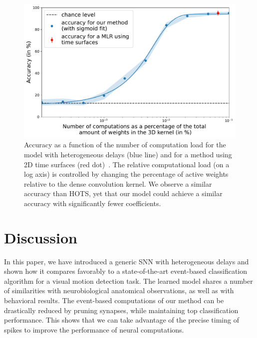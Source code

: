 \documentclass[default]{sn-jnl}%
\theoremstyle{thmstyleone}%
\theoremstyle{thmstyletwo}%
\theoremstyle{thmstylethree}%
\newcommand{\note}[1]{{\sethlcolor{yellow}\hl{#1}}}
\begin{document}
%
\begin{figure}%
    \centering
    \includegraphics[width=0.95\linewidth]{figures/accuracy.pdf}
    \caption{Accuracy as a function of the number of computation load for the model with heterogeneous delays (blue line) and for a method using 2D time surfaces (red dot)~\citep{grimaldi_robust_2022}. The relative computational load (on a log axis) is controlled by changing the percentage of active weights relative to the dense convolution kernel. We observe a similar accuracy than HOTS, yet that our model could achieve a similar accuracy with significantly fewer coefficients.}
    \label{fig:accuracy}
\end{figure}

%
\section{Discussion}
In this paper, we have introduced a generic SNN with heterogeneous delays and shown how it compares favorably to a state-of-the-art event-based classification algorithm for a visual motion detection task. The learned model shares a number of similarities with neurobiological anatomical observations, as well as with behavioral results. The event-based computations of our method can be drastically reduced by pruning synapses, while maintaining top classification performance. This shows that we can take advantage of the precise timing of spikes to improve the performance of neural computations.
%
\end{document}
